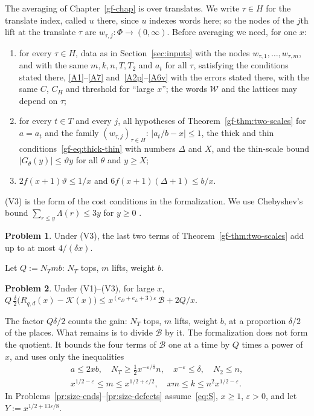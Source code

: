 \documentclass[reqno]{amsart}
\newcounter{chap}
\theoremstyle{definition}
\newtheorem{problem}{Problem}[section]
\theoremstyle{plain}
\newcommand{\Bc}{\mathcal{B}}
\newcommand{\Wc}{\mathcal{W}}
\begin{document}
The averaging of Chapter~\ref{gf-chap} is over translates.  We write \(\tau \in H\) for the translate index, called \(u\) there, since \(u\) indexes words here; so the nodes of the \(j\)th lift at the translate \(\tau\) are \(w_{\tau,j} \colon \Phi \to (0,\infty)\).  Before averaging we need, for one \(x\):
\begin{enumerate}
\item[(V1)] for every \(\tau \in H\), data as in Section~\ref{sec:inputs} with the nodes \(w_{\tau,1}, \dots, w_{\tau,m}\), and with the same \(m, k, n, T, T_2\) and \(a_t\) for all \(\tau\), satisfying the conditions stated there, \eqref{A1}--\eqref{A7} and~\eqref{A2p}--\eqref{A6v} with the errors stated there, with the same \(C\), \(C_H\) and threshold for ``large \(x\)''; the words \(\Wc\) and the lattices may depend on \(\tau\);
\item[(V2)] for every \(t \in T\) and every \(j\), all hypotheses of Theorem~\ref{gf-thm:two-scales} for \(a = a_t\) and the family \((w_{\tau,j})_{\tau \in H}\): \(\lvert a_t/b - x\rvert \le 1\), the thick and thin conditions~\eqref{gf-eq:thick-thin} with numbers \(\Delta\) and \(X\), and the thin-scale bound \(\lvert G_\theta(y)\rvert \le \vartheta y\) for all \(\theta\) and \(y \ge X\);
\item[(V3)] \(2f(x+1)\vartheta \le 1/x\) and \(6f(x+1)(\Delta + 1) \le b/x\).
\end{enumerate}
(V3) is the form of the cost conditions in the formalization.  We use Chebyshev's bound \(\sum_{r \le y}\Lambda(r) \le 3y\) for \(y \ge 0\) \cite{RS}.

\begin{problem}\label{pr:V3}
Under (V3), the last two terms of Theorem~\ref{gf-thm:two-scales} add up to at most \(4/(\delta x)\).
\end{problem}

Let \(Q := N_Tmb\): \(N_T\) tops, \(m\) lifts, weight \(b\).

\begin{problem}\label{pr:average}
Under (V1)--(V3), for large \(x\),
\(
  Q\,\frac{\delta}{2}\bigl(R_{q,d}(x) - \mathcal{K}(x)\bigr) \le x^{(e_D+e_L+3)\varepsilon}\,\Bc + 2Q/x
\).
\end{problem}

The factor \(Q\delta/2\) counts the gain: \(N_T\) tops, \(m\) lifts, weight \(b\), at a proportion \(\delta/2\) of the places.  What remains is to divide \(\Bc\) by it.  The formalization does not form the quotient.  It bounds the four terms of \(\Bc\) one at a time by \(Q\) times a power of \(x\), and uses only the inequalities
\begin{equation}\label{eq:S}\tag{S}
  \begin{gathered}
  a \le 2xb, \quad N_T \ge \tfrac12 x^{-\varepsilon/8}n, \quad x^{-\varepsilon} \le \delta, \quad N_2 \le n, \\
  x^{1/2-\varepsilon} \le m \le x^{1/2+\varepsilon/2}, \quad xm \le k \le n^2x^{1/2-\varepsilon} .
  \end{gathered}
\end{equation}
In Problems~\ref{pr:size-ends}--\ref{pr:size-defects} assume~\eqref{eq:S}, \(x \ge 1\), \(\varepsilon > 0\), and let \(Y := x^{1/2+13\varepsilon/8}\).
\end{document}
